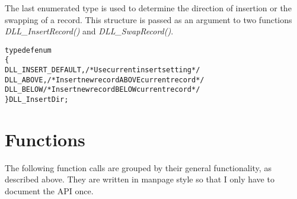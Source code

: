 \documentclass[10pt,letterpaper,titlepage]{article}
\begin{document}
\noindent
The last enumerated type is used to determine the direction of insertion or the swapping of a record.  This structure is passed as an argument to two functions \emph{DLL\_InsertRecord()} and \emph{DLL\_SwapRecord()}.

\small
\begin{alltt}
typedef enum
   \{
   DLL_INSERT_DEFAULT,    /* Use current insert setting */
   DLL_ABOVE,             /* Insert new record ABOVE current record */
   DLL_BELOW              /* Insert new record BELOW current record */
   \} DLL_InsertDir;
\end{alltt}
\normalsize
\pagebreak

\section{Functions}
The following function calls are grouped by their general functionality, as described above.  They are written in manpage style so that I only have to document the API once.
\end{document}
